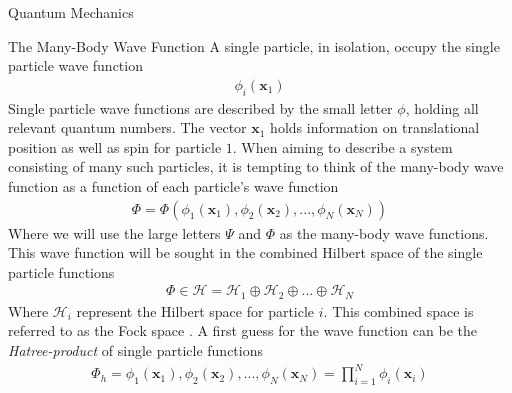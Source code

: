 \documentclass[twoside,english]{uiofysmaster}
\begin{document}
\begin{chapter}{Quantum Mechanics}
 	\begin{section}{The Many-Body Wave Function}
 		A single particle, in isolation, occupy the single particle wave function \cite{Audun,Crawford}
 		\begin{align}
 			\phi_i(\mathbf{x}_1)
 		\end{align}
 		Single particle wave functions are described by the small letter $\phi$, holding all relevant quantum numbers. The vector $\mathbf{x}_1$ holds information on translational position as well as spin for particle $1$. When aiming to describe a system consisting of many such particles, it is tempting to think of the many-body wave function as a function of each particle's wave function 
 		\begin{align}
 			\Phi = \Phi( \phi_1(\mathbf{x}_1), \phi_2(\mathbf{x}_2), ..., \phi_N(\mathbf{x}_N) )
 		\end{align}
 		Where we will use the large letters $\Psi$ and $\Phi$ as the many-body wave functions. This wave function will be sought in the combined Hilbert space of the single particle functions \cite{MHJSlides}
 		\begin{align}
 			\Phi \in \mathcal{H} = \mathcal{H}_1 \oplus \mathcal{H}_2 \oplus ... \oplus \mathcal{H}_N
 		\end{align}
 		Where $\mathcal{H}_i$ represent the Hilbert space for particle $i$. This combined space is referred to as the Fock space \cite{MHJSlides}. A first guess for the wave function can be the \textit{Hatree-product} of single particle functions \cite{Audun,ShavittAndBartlett,Szabo} 
 		\begin{align}
 			\Phi_h = \phi_1(\mathbf{x}_1), \phi_2(\mathbf{x}_2), ..., \phi_N(\mathbf{x}_N) = \prod_{i=1}^N \phi_i(\mathbf{x}_i)
 		\end{align}

 	\end{section}


\end{chapter}
\end{document}
